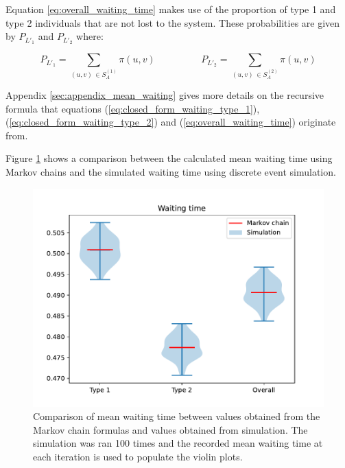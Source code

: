 Equation \ref{eq:overall_waiting_time} makes use of the proportion of type 1 
and type 2 individuals that are not lost to the system. These probabilities are 
given by \(P_{L'_1}\) and \(P_{L'_2}\) where:

\begin{equation}\label{eq:proportion_of_accepting_individuals}
    P_{L'_1} = \sum_{(u,v) \, \in S_A^{(1)}} \pi(u,v) \hspace{2cm}
    P_{L'_2} = \sum_{(u,v) \, \in S_A^{(2)}} \pi(u,v)
\end{equation}
 
Appendix \ref{sec:appendix_mean_waiting} gives more details on the recursive
formula that equations (\ref{eq:closed_form_waiting_type_1}),
(\ref{eq:closed_form_waiting_type_2}) and (\ref{eq:overall_waiting_time})
originate from. 

Figure \ref{fig:markov_vs_des_waiting_time_comparison} shows a comparison 
between the calculated mean waiting time using Markov chains and the simulated waiting time using discrete event simulation.

\begin{figure}[ht]
    \centering
    \includegraphics[width=\textwidth]{imgs/markov_vs_des/waiting_time/main.pdf}
    \caption{
        Comparison of mean waiting time between values obtained from the Markov
        chain formulas and values obtained from simulation. The simulation 
        was ran 100 times and the recorded mean waiting time at each iteration
        is used to populate the violin plots.
    }
    \label{fig:markov_vs_des_waiting_time_comparison}
\end{figure}
